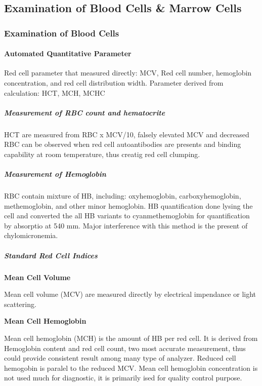 \documentclass[
  letterpaper,
  DIV=11,
  numbers=noendperiod]{scrreprt}
\let\oldparagraph\paragraph
\renewcommand{\paragraph}[1]{\oldparagraph{#1}\mbox{}}
\let\oldsubparagraph\subparagraph
\renewcommand{\subparagraph}[1]{\oldsubparagraph{#1}\mbox{}}
\begin{document}
\subsection{Examination of Blood Cells \& Marrow
Cells}\label{examination-of-blood-cells-marrow-cells}

\subsubsection{Examination of Blood
Cells}\label{examination-of-blood-cells}

\paragraph{Automated Quantitative
Parameter}\label{automated-quantitative-parameter}

Red cell parameter that measured directly: MCV, Red cell number,
hemoglobin concentration, and red cell distribution width. Parameter
derived from calculation: HCT, MCH, MCHC

\subparagraph{Measurement of RBC count and
hematocrite}\label{measurement-of-rbc-count-and-hematocrite}

HCT are measured from RBC x MCV/10, falsely elevated MCV and decreased
RBC can be observed when red cell autoantibodies are presents and
binding capability at room temperature, thus creatig red cell clumping.

\subparagraph{Measurement of
Hemoglobin}\label{measurement-of-hemoglobin}

RBC contain mixture of HB, including: oxyhemoglobin, carboxyhemoglobin,
methemoglobin, and other minor hemoglobin. HB quantification done lysing
the cell and converted the all HB variants to cyanmethemoglobin for
quantification by absorptio at 540 mm. Major interference with this
method is the present of chylomicronemia.

\subparagraph{Standard Red Cell
Indices}\label{standard-red-cell-indices}

\textbf{Mean Cell Volume}

Mean cell volume (MCV) are measured directly by electrical impendance or
light scattering.

\textbf{Mean Cell Hemoglobin}

Mean cell hemoglobin (MCH) is the amount of HB per red cell. It is
derived from Hemoglobin content and red cell count, two most accurate
measurement, thus could provide consistent result among many type of
analyzer. Reduced cell hemogobin is paralel to the reduced MCV. Mean
cell hemoglobin concentration is not used much for diagnostic, it is
primarily ised for quality control purpose.
\end{document}
